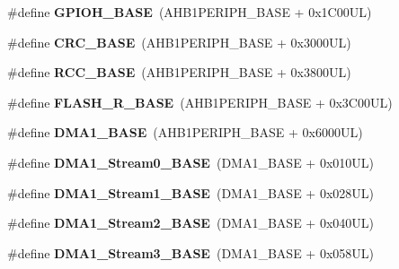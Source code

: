 \begin{DoxyCompactItemize}
\#define {\bfseries G\+P\+I\+O\+H\+\_\+\+B\+A\+SE}~(A\+H\+B1\+P\+E\+R\+I\+P\+H\+\_\+\+B\+A\+SE + 0x1\+C00\+U\+L)
\item 
\mbox{\label{group___peripheral__memory__map_ga656a447589e785594cbf2f45c835ad7e}} 
\#define {\bfseries C\+R\+C\+\_\+\+B\+A\+SE}~(A\+H\+B1\+P\+E\+R\+I\+P\+H\+\_\+\+B\+A\+SE + 0x3000\+U\+L)
\item 
\mbox{\label{group___peripheral__memory__map_ga0e681b03f364532055d88f63fec0d99d}} 
\#define {\bfseries R\+C\+C\+\_\+\+B\+A\+SE}~(A\+H\+B1\+P\+E\+R\+I\+P\+H\+\_\+\+B\+A\+SE + 0x3800\+U\+L)
\item 
\mbox{\label{group___peripheral__memory__map_ga8e21f4845015730c5731763169ec0e9b}} 
\#define {\bfseries F\+L\+A\+S\+H\+\_\+\+R\+\_\+\+B\+A\+SE}~(A\+H\+B1\+P\+E\+R\+I\+P\+H\+\_\+\+B\+A\+SE + 0x3\+C00\+U\+L)
\item 
\mbox{\label{group___peripheral__memory__map_gab2d8a917a0e4ea99a22ac6ebf279bc72}} 
\#define {\bfseries D\+M\+A1\+\_\+\+B\+A\+SE}~(A\+H\+B1\+P\+E\+R\+I\+P\+H\+\_\+\+B\+A\+SE + 0x6000\+U\+L)
\item 
\mbox{\label{group___peripheral__memory__map_ga0d3c52aa35dcc68f78b704dfde57ba95}} 
\#define {\bfseries D\+M\+A1\+\_\+\+Stream0\+\_\+\+B\+A\+SE}~(D\+M\+A1\+\_\+\+B\+A\+SE + 0x010\+U\+L)
\item 
\mbox{\label{group___peripheral__memory__map_ga5b4152cef577e37eccc9311d8bdbf3c2}} 
\#define {\bfseries D\+M\+A1\+\_\+\+Stream1\+\_\+\+B\+A\+SE}~(D\+M\+A1\+\_\+\+B\+A\+SE + 0x028\+U\+L)
\item 
\mbox{\label{group___peripheral__memory__map_ga48a551ee91d3f07dd74347fdb35c703d}} 
\#define {\bfseries D\+M\+A1\+\_\+\+Stream2\+\_\+\+B\+A\+SE}~(D\+M\+A1\+\_\+\+B\+A\+SE + 0x040\+U\+L)
\item 
\mbox{\label{group___peripheral__memory__map_gac51deb54ff7cfe1290dfcf517ae67127}} 
\#define {\bfseries D\+M\+A1\+\_\+\+Stream3\+\_\+\+B\+A\+SE}~(D\+M\+A1\+\_\+\+B\+A\+SE + 0x058\+U\+L)

\end{DoxyCompactItemize}
